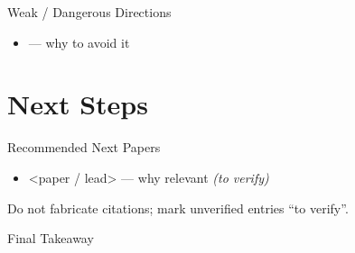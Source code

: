 \documentclass[aspectratio=169]{beamer}
\begin{document}
\begin{frame}{Weak / Dangerous Directions}
  \begin{itemize}
    \item <tempting but weak direction> --- why to avoid it
  \end{itemize}
\end{frame}

\section{Next Steps}
\begin{frame}{Recommended Next Papers}
  \begin{itemize}
    \item <paper / lead> --- why relevant \hfill \emph{(to verify)}
  \end{itemize}
  \footnotesize Do not fabricate citations; mark unverified entries ``to verify''.
\end{frame}

\begin{frame}{Final Takeaway}
  \begin{center}
  \end{center}
\end{frame}
\end{document}
